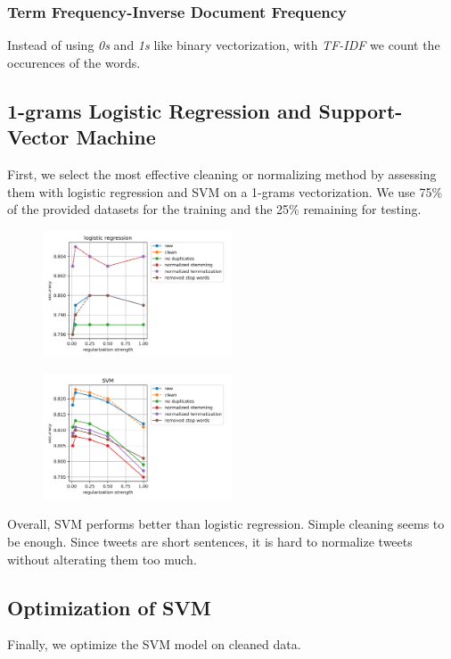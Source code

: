 \documentclass[11pt, a4paper, twocolumn]{article}
\begin{document}
\subsubsection{Term Frequency-Inverse Document Frequency}
Instead of using \textit{0s} and \textit{1s} like binary vectorization, with \textit{TF-IDF} we count the occurences of the words.

\subsection{1-grams Logistic Regression and Support-Vector Machine}
First, we select the most effective cleaning or normalizing method by assessing them with logistic regression and SVM on a 1-grams vectorization. We use 75\% of the provided datasets for the training and the 25\% remaining for testing.

\begin{figure}[h]
	\centering
	\includegraphics[width=0.5\textwidth]{../plots/logreg.png}
\end{figure}

\begin{figure}[h]
	\includegraphics[width=0.5\textwidth]{../plots/svm.png}
\end{figure}

Overall, SVM performs better than logistic regression. Simple cleaning seems to be enough. Since tweets are short sentences, it is hard to normalize tweets without alterating them too much.

\subsection{Optimization of SVM}
Finally, we optimize the SVM model on cleaned data.
\end{document}
